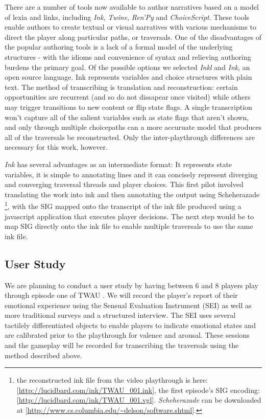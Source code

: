 There are a number of tools now available to author narratives based
on a model of lexia and links, including \emph{Ink}, \emph{Twine}, \emph{Ren'Py} and
\emph{ChoiceScript}. These tools enable authors to create textual or visual
narratives with various mechanisms to direct the player along
particular paths, or traversals. One of the disadvantages of the
popular authoring tools is a lack of a formal model of the underlying
structures - with the idioms and convenience of syntax and relieving
authoring burdens the primary goal. Of the possible options we
selected \emph{Inkl} and \emph{Ink}, an open source language. Ink represents
variables and choice structures with plain text. The method of
transcribing is translation and reconstruction: certain opportunities
are recurrent (and so do not dissapear once visited) while others may
trigger transitions to new content or flip state flags. A single
transcription won't capture all of the salient variables such as state
flags that aren't shown, and only through multiple choicepaths can a
more accuruate model that produces all of the traversals be
reconstructed. Only the inter-playthrough differences are necessary
for this work, however.

\emph{Ink} has several advantages as an intermediate format: It represents
state variables, it is simple to annotating lines and it can concisely
represent diverging and converging traversal threads and player
choices. This first pilot involved translating the work into ink and
then annotating the output using Scheherazade \footnote{the reconstructed ink file from the video playthrough is here:
[\url{http://lucidbard.com/ink/TWAU_001.ink}], the first episode's SIG
encoding: [\url{http://lucidbard.com/ink/TWAU_001.vgl}]. \emph{Scheherazade} can
be downloaded at [\url{http://www.cs.columbia.edu/~delson/software.shtml}].}, with the SIG
mapped onto the transcript of the ink file produced using a javascript
application that executes player decisions. The next step would be to
map SIG directly onto the ink file to enable multiple traversals to
use the same ink file.

\subsection{User Study}
\label{sec:orgheadline6}
We are planning to conduct a user study by having between 6 and 8
players play through episode one of TWAU . We will record the player's
report of their emotional experience using the Sensual Evaluation
Instrument (SEI) \cite{Laaksolahti2009-uw} as well as more traditional
surveys and a structured interview. The SEI uses several tactilely
differentiated objects to enable players to indicate emotional states
and are calibrated prior to the playthrough for valence and
arousal. These sessions and the gameplay will be recorded for
transcribing the traversals using the method described above.

